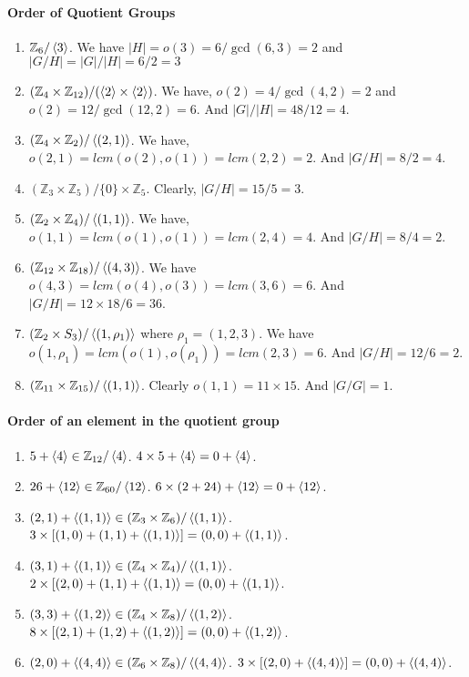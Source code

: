 \paragraph{Order of Quotient Groups}
\begin{enumerate}
	\item $\mathbb{Z}_6/\left\langle 3 \right\rangle$.
	We have $|H| = o(3) = 6/\gcd(6,3) = 2$ and $|G/H| = |G|/|H| = 6/2 = 3$
	\item $(\mathbb{Z}_4 \times \mathbb{Z}_{12})/(\left\langle 2 \right\rangle \times \left\langle 2 \right\rangle)$.
	We have, $o(2)=4/\gcd(4,2) = 2$ and $o(2) = 12/\gcd(12,2) = 6$. And $|G|/|H| = 48/12 = 4$.
	\item $(\mathbb{Z}_4 \times \mathbb{Z}_2)/\left\langle (2,1) \right\rangle$.
	We have, $o(2,1) = lcm(o(2),o(1)) = lcm(2,2) = 2$. And $|G/H| = 8/2 = 4$.
	\item $(\mathbb{Z}_3 \times \mathbb{Z}_5)/\{0\} \times \mathbb{Z}_5$.
	Clearly, $|G/H| = 15/5 = 3$.
	\item $(\mathbb{Z}_2 \times \mathbb{Z}_4)/\left\langle (1,1) \right\rangle$.
	We have, $o(1,1) = lcm(o(1),o(1)) = lcm(2,4) = 4$. And $|G/H| = 8/4 = 2$.
	\item $(\mathbb{Z}_{12} \times \mathbb{Z}_{18})/\left\langle (4,3) \right\rangle$.
	We have $o(4,3) = lcm(o(4),o(3)) = lcm(3,6) = 6$. And $|G/H| = 12 \times 18/6 = 36$.
	\item $(\mathbb{Z}_2 \times S_3)/\left\langle (1,\rho_1) \right\rangle$ where $\rho_1 = (1,2,3)$.
	We have $o(1,\rho_1) = lcm(o(1),o(\rho_1)) = lcm(2,3) = 6$. And $|G/H| = 12/6 = 2$.
	\item $(\mathbb{Z}_{11} \times \mathbb{Z}_{15})/\left\langle (1,1) \right\rangle$.
	Clearly $o(1,1) = 11 \times 15$. And $|G/G| = 1$.
\end{enumerate}

\paragraph{Order of an element in the quotient group}
\begin{enumerate}
	\item $5+\left\langle 4 \right\rangle \in \mathbb{Z}_{12}/\left\langle 4 \right\rangle$.
	$4 \times 5+\left\langle 4 \right\rangle = 0+\left\langle 4 \right\rangle$.
	\item $26+\left\langle 12 \right\rangle \in \mathbb{Z}_{60}/\left\langle 12 \right\rangle$.
	$6 \times (2+24)+\left\langle 12 \right\rangle = 0 + \left\langle 12 \right\rangle$.	
	\item $(2,1)+\left\langle (1,1) \right\rangle \in (\mathbb{Z}_3 \times \mathbb{Z}_6)/\left\langle (1,1) \right\rangle$.
	$3 \times [(1,0)+(1,1)+\left\langle (1,1) \right\rangle] = (0,0) + \left\langle (1,1) \right\rangle$.
	\item $(3,1)+\left\langle (1,1) \right\rangle \in (\mathbb{Z}_4 \times \mathbb{Z}_4)/\left\langle (1,1) \right\rangle$.
	$2 \times [(2,0)+(1,1)+\left\langle (1,1) \right\rangle = (0,0) + \left\langle (1,1) \right\rangle$.
	\item $(3,3) + \left\langle (1,2) \right\rangle \in (\mathbb{Z}_4 \times \mathbb{Z}_8)/\left\langle (1,2) \right\rangle$.
	$8 \times [(2,1) + (1,2)+\left\langle (1,2) \right\rangle] = (0,0) + \left\langle (1,2) \right\rangle$.
	\item $(2,0) + \left\langle (4,4) \right\rangle \in (\mathbb{Z}_6 \times \mathbb{Z}_8)/\left\langle (4,4) \right\rangle$.
	$3 \times [(2,0)+\left\langle (4,4) \right\rangle] = (0,0) + \left\langle (4,4) \right\rangle$.
\end{enumerate}


